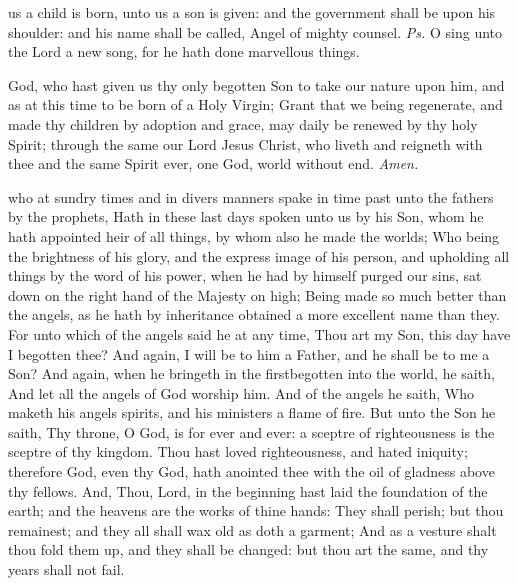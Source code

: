 \label{NativityMassIII}


\introit
{} us a child is born, unto us a son is given: and the government shall be upon his shoulder: and his name shall be called, Angel of mighty counsel. \textit{Ps.} O sing unto the Lord a new song, for he hath done marvellous things.

\collect\label{NativityMassIIICollect}
 God, who hast given us thy only begotten Son to take our nature upon him, and as at this time to be born of a Holy Virgin; Grant that we being regenerate, and made thy children by adoption and grace, may daily be renewed by thy holy Spirit; through the same our Lord Jesus Christ, who liveth and reigneth with thee and the same Spirit ever, one God, world without end. \textit{Amen.}

 who at sundry times and in divers manners spake in time past unto the fathers by the prophets, Hath in these last days spoken unto us by his Son, whom he hath appointed heir of all things, by whom also he made the worlds; Who being the brightness of his glory, and the express image of his person, and upholding all things by the word of his power, when he had by himself purged our sins, sat down on the right hand of the Majesty on high; Being made so much better than the angels, as he hath by inheritance obtained a more excellent name than they. For unto which of the angels said he at any time, Thou art my Son, this day have I begotten thee? And again, I will be to him a Father, and he shall be to me a Son? And again, when he bringeth in the firstbegotten into the world, he saith, And let all the angels of God worship him. And of the angels he saith, Who maketh his angels spirits, and his ministers a flame of fire. But unto the Son he saith, Thy throne, O God, is for ever and ever: a sceptre of righteousness is the sceptre of thy kingdom. Thou hast loved righteousness, and hated iniquity; therefore God, even thy God, hath anointed thee with the oil of gladness above thy fellows. And, Thou, Lord, in the beginning hast laid the foundation of the earth; and the heavens are the works of thine hands: They shall perish; but thou remainest; and they all shall wax old as doth a garment; And as a vesture shalt thou fold them up, and they shall be changed: but thou art the same, and thy years shall not fail.

